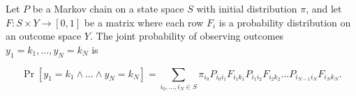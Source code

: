 Let $P$ be a Markov chain on a state space $S$ with initial distribution $\pi$, and let $F: S \times Y \to [0,1]$ be a matrix where each row $F_i$ is a probability distribution on an outcome space $Y$. The joint probability of observing outcomes $y_1 = k_1, \dots, y_N = k_N$ is

$$\Pr[y_1 = k_1 \wedge \dots \wedge y_N = k_N] = \sum_{i_0, \dots, i_N \in S} \pi_{i_0} P_{i_0 i_1} F_{i_1 k_1} P_{i_1 i_2} F_{i_2 k_2} \dots P_{i_{N-1} i_N} F_{i_N k_N}.$$
